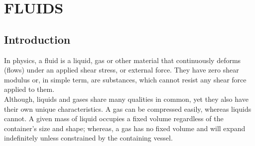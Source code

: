 \documentclass[11pt]{report}
\begin{document}
	
	\chapter{FLUIDS}
	\section{Introduction}
	In physics, a fluid is a liquid, gas or other material that continuously deforms (flows) under an applied shear stress, or external force. They have zero shear modulus or, in simple term, are substances, which cannot resist any shear force applied to them.\\
	
	Although, liquids and gases share many qualities in common, yet they also have their own unique characteristics. A gas can be compressed easily, whereas liquids cannot. A given mass of liquid occupies a fixed volume regardless of the container's size and shape; whereas, a gas has no fixed volume and will expand indefinitely unless constrained by the containing vessel.
	
\end{document}
